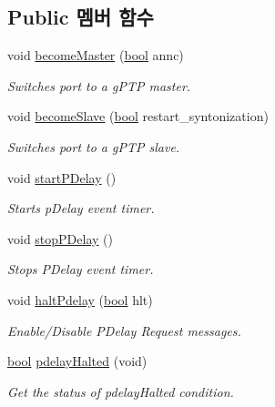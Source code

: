 \subsection*{Public 멤버 함수}
\begin{DoxyCompactItemize}
\item 
void \hyperlink{class_ether_port_af952d115c5f8260d7c0006e2236ef6e6}{become\+Master} (\hyperlink{avb__gptp_8h_af6a258d8f3ee5206d682d799316314b1}{bool} annc)
\begin{DoxyCompactList}\small\item\em Switches port to a g\+P\+TP master. \end{DoxyCompactList}\item 
void \hyperlink{class_ether_port_aa460e91a1efda3acef0e0ef519fee240}{become\+Slave} (\hyperlink{avb__gptp_8h_af6a258d8f3ee5206d682d799316314b1}{bool} restart\+\_\+syntonization)
\begin{DoxyCompactList}\small\item\em Switches port to a g\+P\+TP slave. \end{DoxyCompactList}\item 
void \hyperlink{class_ether_port_ab099720a7511dbef4546f70e5e3b1075}{start\+P\+Delay} ()
\begin{DoxyCompactList}\small\item\em Starts p\+Delay event timer. \end{DoxyCompactList}\item 
void \hyperlink{class_ether_port_aaa1e225dbffab5d500fb93e65b60d865}{stop\+P\+Delay} ()
\begin{DoxyCompactList}\small\item\em Stops P\+Delay event timer. \end{DoxyCompactList}\item 
void \hyperlink{class_ether_port_a84b0f8f57f88ce988df47160a1e38ec9}{halt\+Pdelay} (\hyperlink{avb__gptp_8h_af6a258d8f3ee5206d682d799316314b1}{bool} hlt)
\begin{DoxyCompactList}\small\item\em Enable/\+Disable P\+Delay Request messages. \end{DoxyCompactList}\item 
\hyperlink{avb__gptp_8h_af6a258d8f3ee5206d682d799316314b1}{bool} \hyperlink{class_ether_port_a356f9b85961c457162c78205f18ad572}{pdelay\+Halted} (void)
\begin{DoxyCompactList}\small\item\em Get the status of pdelay\+Halted condition. \end{DoxyCompactList}\item 

\end{DoxyCompactItemize}
